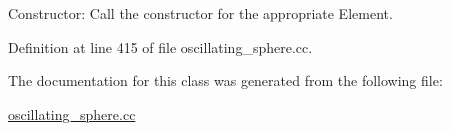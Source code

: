 Constructor\+: Call the constructor for the appropriate Element. 



Definition at line 415 of file oscillating\+\_\+sphere.\+cc.



The documentation for this class was generated from the following file\+:\begin{DoxyCompactItemize}
\item 
\hyperlink{oscillating__sphere_8cc}{oscillating\+\_\+sphere.\+cc}\end{DoxyCompactItemize}

